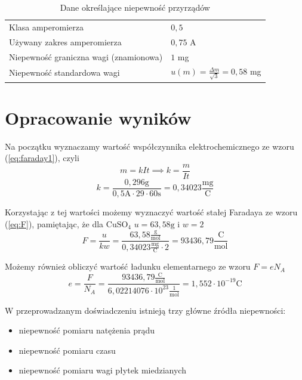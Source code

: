 \documentclass{fizykalab}
\newcommand{\s}{\ensuremath{\text{s}}}
\newcommand{\g}{\ensuremath{\text{g}}}
\newcommand{\ampr}{\ensuremath{\text{A}}}
\newcommand{\mgC}{\ensuremath{\frac{\text{mg}}{\text{C}}}}
\begin{document}
\begin{table}[H]
    \centering
    \caption{Dane określające niepewność przyrządów}
    \begin{tabular}{ll}
         Klasa amperomierza & $0,5$  \\
         Używany zakres amperomierza & $0,75$ A \\
         Niepewność graniczna wagi (znamionowa) & $1$ mg  \\
         Niepewność standardowa wagi  & $u(m) = \frac{\Delta m}{\sqrt{3}} = 0,58$ mg \\
         
    \end{tabular}
\end{table}
\section{Opracowanie wyników}
Na początku wyznaczamy wartość współczynnika elektrochemicznego
ze wzoru (\ref{eq:faraday1}), czyli
\begin{equation*}
    m = kIt \implies  k = \frac{m}{It}
\end{equation*}
\begin{equation*}
    k = \frac{0,296 \g}{0,5 \ampr \cdot 29 \cdot 60 \s} = 
    0,34023 \mgC
\end{equation*}

Korzystając z tej wartości możemy wyznaczyć wartość
stałej Faradaya ze wzoru (\ref{eq:F}), pamiętając, że 
dla $\text{CuSO}_4$ $u = 63,58 \g$ i $w = 2$
\begin{equation*}
    F = \frac{u}{kw} = \frac{63,58 \frac{\g}{\text{mol}} }{0,34023 \mgC \cdot 2} = 
    93436,79  \frac{\text{C}}{\text{mol}}
\end{equation*}


Możemy również obliczyć wartość ładunku elementarnego ze 
wzoru $F = e N_A$
\begin{equation*}
    e = \frac{F} {N_A} = \frac{93436,79
    \frac{\text{C}}{\text{mol}}}
    {6,02214076 \cdot 10^{23} \frac{1}{\text{mol}} } = 
    1,552 \cdot 10^{-19} \text{C} 
\end{equation*}






W przeprowadzanym doświadczeniu istnieją trzy główne źródła niepewności:
\begin{itemize}
    \item niepewność pomiaru natężenia prądu
    \item niepewność pomiaru czasu
    \item niepewność pomiaru wagi płytek miedzianych
\end{itemize}
\end{document}
